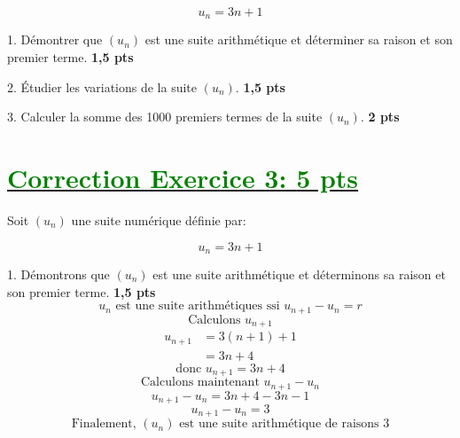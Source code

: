 \documentclass[12pt]{article}
\begin{document}
\[ u_n = 3n + 1 \]

1. Démontrer que $(u_n)$ est une suite arithmétique et déterminer sa raison et son premier terme. \textbf{1,5 pts}

2. Étudier les variations de la suite $(u_n)$. \textbf{1,5 pts}

3. Calculer la somme des 1000 premiers termes de la suite $(u_n)$. \textbf{2 pts}

\section*{\underline{\textcolor{green}{Correction Exercice 3: \textbf{5 pts}}}}
Soit $(u_n)$ une suite numérique définie par:

\[ u_{n} = 3n + 1 \]

1. Démontrons que $(u_n)$ est une suite arithmétique et déterminons sa raison et son premier terme. \textbf{1,5 pts}
\[u_{n} \text{ est une suite arithmétiques ssi }  u_{n+1}-u_{n}=r \]
\[\text{Calculons } u_{n+1}\]
\begin{align*}
u_{n+1}&=3(n+1) + 1\\
&=3n+4
\end{align*}
\[\text{donc } u_{n+1}=3n+4\]
\[\text{Calculons maintenant } u_{n+1}-u_{n}\]
\[u_{n+1}-u_{n}=3n+4-3n-1\]
\[u_{n+1}-u_{n}=3\]
\[\text{Finalement, } (u_{n}) \text{ est une suite arithmétique de raisons } 3\]

\end{document}
